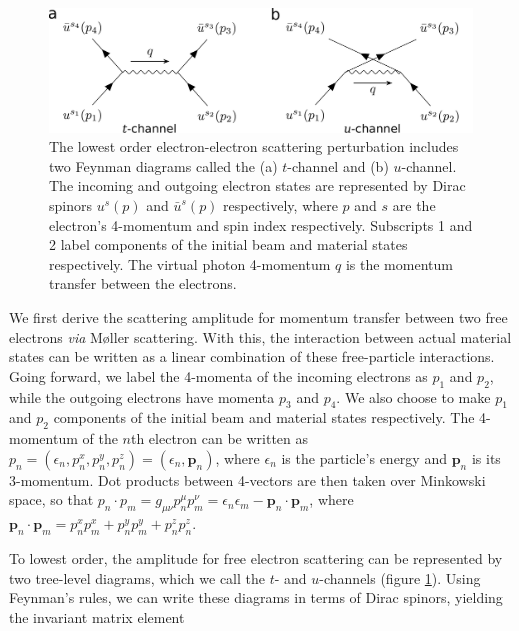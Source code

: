 \documentclass{article}
\begin{document}
\begin{figure}
  \centering
  \includegraphics[width=.9\textwidth]{figures/tu.pdf}
  \caption{
    The lowest order electron-electron scattering perturbation includes two
    Feynman diagrams called the (a) $t$-channel and (b) $u$-channel.
    The incoming and outgoing electron states are represented by Dirac spinors
    $u^s(p)$ and $\bar{u}^s(p)$ respectively, where $p$ and $s$ are the electron's
    4-momentum and spin index respectively.
    Subscripts 1 and 2 label components of the initial beam and material states
    respectively.
    The virtual photon 4-momentum $q$ is the momentum transfer between the
    electrons.
  }
\label{fig:tu}
\end{figure}

We first derive the scattering amplitude for momentum transfer between two free
electrons \textit{via} M{\o}ller scattering. \cite{Moller1932, Kragh1992,
Roqu1992}
With this, the interaction between actual material states can be written as a
linear combination of these free-particle interactions.
Going forward, we label the 4-momenta of the incoming electrons as $p_1$ and
$p_2$, while the outgoing electrons have momenta $p_3$ and $p_4$.
We also choose to make $p_1$ and $p_2$ components of the initial beam and
material states respectively.
The 4-momentum of the $n$th electron can be written as
$p_n = (\epsilon_n, p_n^x, p_n^y, p_n^z) = (\epsilon_n, \mathbf{p}_n)$,
where $\epsilon_n$ is the particle's energy and $\mathbf{p}_n$ is its
3-momentum.
Dot products between 4-vectors are then taken over Minkowski space, so that
$p_n\cdot p_m
=
g_{\mu\nu}p_n^\mu p_m^\nu
=
\epsilon_n\epsilon_m -
\mathbf{p}_n\cdot\mathbf{p}_m$,
where
$\mathbf{p}_n\cdot\mathbf{p}_m
=
p_n^xp_m^x + p_n^yp_m^y + p_n^zp_n^z$.   

To lowest order, the amplitude for free electron scattering can be represented
by two tree-level diagrams, which we call the $t$- and $u$-channels (figure
\ref{fig:tu}).
Using Feynman's rules, \cite{Peskin1995, Lancaster2014} we can write these
diagrams in terms of Dirac spinors, yielding the invariant matrix element
\end{document}
